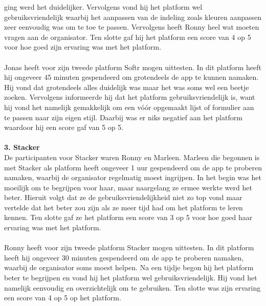 ging werd het duidelijker. Vervolgens vond hij het platform wel gebruiksvriendelijk waarbij het aanpassen van de indeling zoals kleuren aanpassen zeer eenvoudig was om te toe te passen. Vervolgens heeft Ronny
heel wat moeten vragen aan de organisator.
Ten slotte gaf hij het platform een score van 4 op 5 voor hoe goed zijn ervaring was met het platform.
\\
\\
Jonas heeft voor zijn tweede platform Softr mogen uittesten. In dit platform heeft hij ongeveer 45 minuten gespendeerd om grotendeels de app te kunnen namaken.
Hij vond dat grotendeels alles duidelijk was maar het was soms wel een beetje zoeken. Vervolgens informeerde hij dat het platform gebruiksvriendelijk is, want hij vond het namelijk gemakkelijk om
een vóór opgemaakt lijst of formulier aan te passen naar zijn eigen stijl. Daarbij was er niks negatief aan het platform waardoor hij een score gaf van 5 op 5.
\\
\\
\textbf{3. Stacker}
\\
De participanten voor Stacker waren Ronny en Marleen. Marleen die begonnen is met Stacker als platform heeft ongeveer 1 uur  gespendeerd om de app te proberen namaken, waarbij de organisator regelmatig moest ingrijpen.
In het begin was het moeilijk om te begrijpen voor haar, maar naargelang ze ermee werkte werd het beter. Hieruit volgt dat ze de gebruiksvriendelijkheid niet zo top vond maar vertelde dat het beter zou zijn als ze meer tijd had om het platform te leren kennen.
Ten slotte gaf ze het platform een score van 3 op 5 voor hoe goed haar ervaring was met het platform.
\\
\\
Ronny heeft voor zijn tweede platform Stacker mogen uittesten. In dit platform heeft hij ongeveer 30 minuten gespendeerd om de app te proberen namaken, waarbij de organisator soms moest helpen.
Na een tijdje begon hij het platform beter te begrijpen en vond hij het platform wel gebruiksvriendelijk. Hij vond het namelijk eenvoudig en overzichtelijk om te gebruiken. Ten slotte was zijn ervaring een 
score van 4 op 5 op het platform.